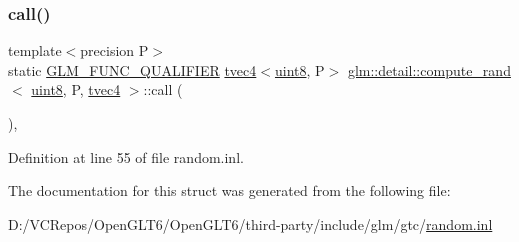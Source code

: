 \subsubsection{\texorpdfstring{call()}{call()}}
{\footnotesize\ttfamily template$<$precision P$>$ \\
static \mbox{\hyperlink{setup_8hpp_a33fdea6f91c5f834105f7415e2a64407}{G\+L\+M\+\_\+\+F\+U\+N\+C\+\_\+\+Q\+U\+A\+L\+I\+F\+I\+ER}} \mbox{\hyperlink{structglm_1_1tvec4}{tvec4}}$<$\mbox{\hyperlink{namespaceglm_1_1detail_aef2588f97d090cc19fbbe0c74fe17c8f}{uint8}}, P$>$ \mbox{\hyperlink{structglm_1_1detail_1_1compute__rand}{glm\+::detail\+::compute\+\_\+rand}}$<$ \mbox{\hyperlink{namespaceglm_1_1detail_aef2588f97d090cc19fbbe0c74fe17c8f}{uint8}}, P, \mbox{\hyperlink{structglm_1_1tvec4}{tvec4}} $>$\+::call (\begin{DoxyParamCaption}{ }\end{DoxyParamCaption})\hspace{0.3cm}{\ttfamily [inline]}, {\ttfamily [static]}}



Definition at line 55 of file random.\+inl.



The documentation for this struct was generated from the following file\+:\begin{DoxyCompactItemize}
\item 
D\+:/\+V\+C\+Repos/\+Open\+G\+L\+T6/\+Open\+G\+L\+T6/third-\/party/include/glm/gtc/\mbox{\hyperlink{random_8inl}{random.\+inl}}\end{DoxyCompactItemize}
